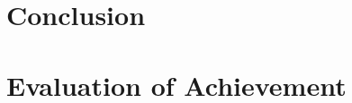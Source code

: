 \documentclass{article}
\begin{document}
	\section{Conclusion}
		\lipsum[5]
				
	\section{Evaluation of Achievement}
		\lipsum[6]
				
	
	
	
			
	\newpage	
		
			
	
	
	

	\newpage
\end{document}
